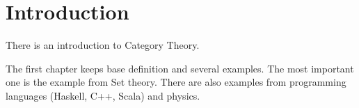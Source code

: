 \chapter*{Introduction}

There is an introduction to Category Theory. 

The first chapter keeps base definition and several examples. The most
important one is the example from Set theory. There are also examples
from programming languages (Haskell, C++, Scala) and physics.

